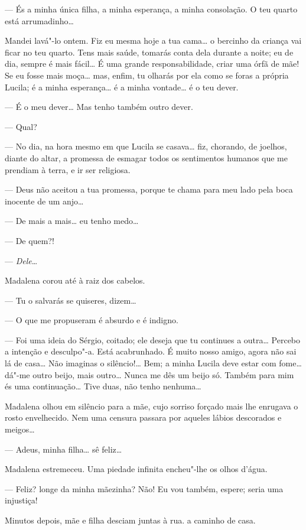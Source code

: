 --- És a minha única filha, a minha esperança, a minha consolação. O teu
quarto está arrumadinho\ldots{}

Mandei lavá"-lo ontem. Fiz eu mesma hoje a tua cama\ldots{} o bercinho da
criança vai ficar no teu quarto. Tens mais saúde, tomarás conta dela
durante a noite; eu de dia, sempre é mais fácil\ldots{} É uma grande
responsabilidade, criar uma órfã de mãe! Se eu fosse mais moça\ldots{} mas,
enfim, tu olharás por ela como se foras a própria Lucila; é a minha
esperança\ldots{} é a minha vontade\ldots{} é o teu dever.

--- É o meu dever\ldots{} Mas tenho também outro dever.

--- Qual?

--- No dia, na hora mesmo em que Lucila se casava\ldots{} fiz, chorando, de
joelhos, diante do altar, a promessa de esmagar todos os sentimentos
humanos que me prendiam à terra, e ir ser religiosa.

--- Deus não aceitou a tua promessa, porque te chama para meu lado pela
boca inocente de um anjo\ldots{}

--- De mais a mais\ldots{} eu tenho medo\ldots{}

--- De quem?!

--- \emph{Dele}\ldots{}

Madalena corou até à raiz dos cabelos.

--- Tu o salvarás se quiseres, dizem\ldots{}

--- O que me propuseram é absurdo e é indigno.

--- Foi uma ideia do Sérgio, coitado; ele deseja que tu continues a
outra\ldots{} Percebo a intenção e desculpo"-a. Está acabrunhado. É muito
nosso amigo, agora não sai lá de casa\ldots{} Não imaginas o silêncio!\ldots{}
Bem; a minha Lucila deve estar com fome\ldots{} dá"-me outro beijo, mais
outro\ldots{} Nunca me dês um beijo só. Também para mim és uma continuação\ldots{}
Tive duas, não tenho nenhuma\ldots{}

Madalena olhou em silêncio para a mãe, cujo sorriso forçado mais lhe
enrugava o rosto envelhecido. Nem uma censura passara por aqueles lábios
descorados e meigos\ldots{}

--- Adeus, minha filha\ldots{} sê feliz\ldots{}

Madalena estremeceu. Uma piedade infinita encheu"-lhe os olhos d'água.

--- Feliz? longe da minha mãezinha? Não! Eu vou também, espere; seria
uma injustiça!

Minutos depois, mãe e filha desciam juntas à rua. a caminho de casa.

